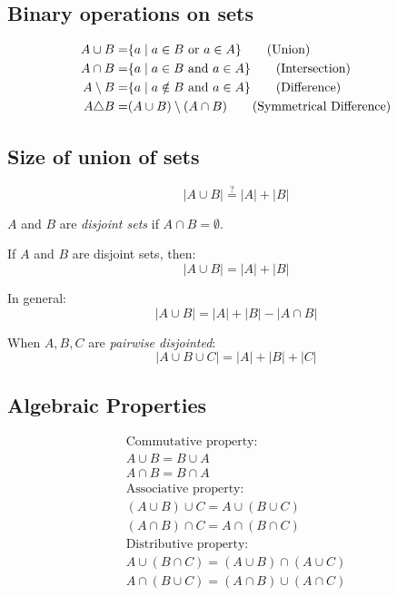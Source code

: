 \documentclass[00_complete]{subfiles}
\begin{document}
\subsection{Binary operations on sets}
\begin{align}
    A \cup B =& \{a \;|\; a \in B \text{ or } a \in A \} \tag{\text{Union}} \\
    A \cap B =& \{a \;|\; a \in B \text{ and } a \in A \}
    \tag{\text{Intersection}} \\
    A \setminus B =& \{a \;|\; a \notin B \text{ and } a \in A \}
    \tag{\text{Difference}} \\
    A \triangle B =& (A \cup B) \setminus (A \cap B) \tag{\text{Symmetrical
    Difference}}
\end{align}

\subsection{Size of union of sets}

$$|A \cup B| \overset{?}{=} |A| + |B|$$

\begin{definition}
$A$ and $B$ are \emph{disjoint sets} if $A \cap B = \emptyset$.

If $A$ and $B$ are disjoint sets, then:
$$|A \cup B| = |A| + |B|$$
\end{definition}
In general:
$$|A \cup B| = |A| + |B|- |A \cap B|$$

When $A, B, C$ are \emph{pairwise disjointed}:
$$|A \cup B \cup C| = |A| + |B| + |C|$$

\subsection{Algebraic Properties}

\begin{gather*}
    \text{Commutative property:} \\
    A \cup B = B \cup A \\
    A \cap B = B \cap A \\
    \text{Associative property:} \\
    (A \cup B) \cup C = A \cup (B \cup C) \\
    (A \cap B) \cap C = A \cap (B \cap C) \\
    \text{Distributive property:} \\
    A \cup (B \cap C) = (A \cup B) \cap (A \cup C) \\
    A \cap (B \cup C) = (A \cap B) \cup (A \cap C) \\
\end{gather*}
\end{document}

